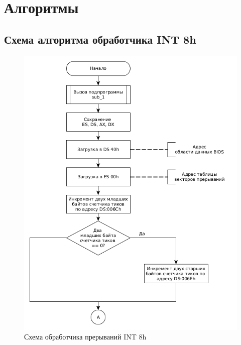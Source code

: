 \section{Алгоритмы}

\subsection{Схема алгоритма обработчика INT 8h}

\begin{figure}[ht!]
	\begin{center}
		\includegraphics[scale=0.65]{img/int8h_01}
	\end{center}
	\captionsetup{justification=centering}
	\caption{Схема обработчика прерываний INT 8h}
	\label{img:i1}
\end{figure}
\FloatBarrier

